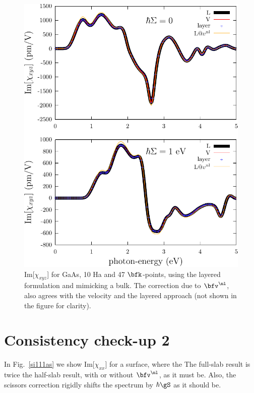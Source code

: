 \begin{figure}[b]
\centering
\includegraphics[scale=.7]{figures/plots/shg-bulk}
\caption{Im[$\chi_{xyz}$] for GaAs, 10 Ha and 47 $\bfk$-points, using
  the layered formulation and mimicking a bulk. 
The correction
  due to $\bfv^\nl$, also agrees with the velocity and the layered
  approach (not shown in the figure for clarity).}
\label{gaas}
\end{figure}


\section{Consistency check-up 2}

In Fig.~\ref{si111as} we show
Im[$\chi_{xx}$] for a surface, where the 
The full-slab result is twice the half-slab
result, with or without $\bfv^\nl$,  as it must be. Also, the scissors
correction rigidly shifts the spectrum by $\hbar\gS$ as it should be.  


